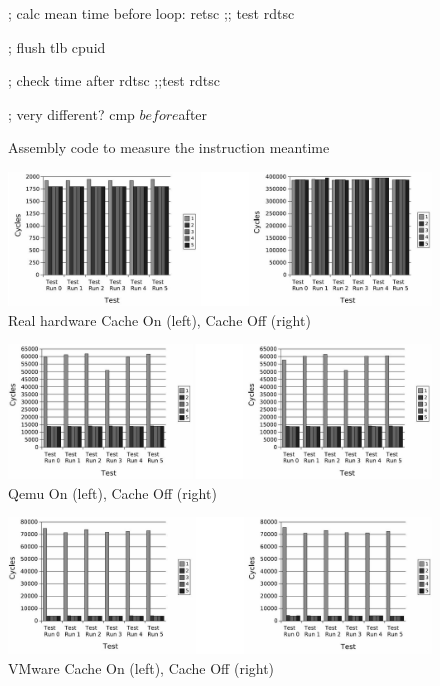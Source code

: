 \begin{figure}[h]
\begin{lstc}
; calc mean time before
loop:
	retsc
	;; test
	rdtsc

; flush tlb
cpuid

; check time after
rdtsc
;;test
rdtsc

; very different? 
cmp $before $after
\end{lstc}
\caption{\label{fig:cache_mitigation} Assembly code to measure the instruction meantime}
\end{figure}


\begin{figure}[!t]
	\centering
	\includegraphics[width=\textwidth]{figure/realhw.jpg}
	\caption{Real hardware Cache On (left), Cache Off (right)}
	\label{fig:cache_realhw}
\end{figure}

\begin{figure}[!t]
	\centering
	\includegraphics[width=\textwidth]{figure/qemu.jpg}
	\caption{Qemu On (left), Cache Off (right)}
	\label{fig:cache_qemu}
\end{figure}

\begin{figure}[!t]
	\centering
	\includegraphics[width=\textwidth]{figure/vmware.jpg}
	\caption{VMware Cache On (left), Cache Off (right)}
	\label{fig:cache_vmware}
\end{figure}

